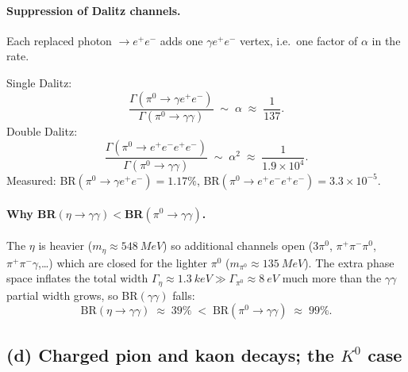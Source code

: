 \documentclass[11pt]{article}
\begin{document}
\paragraph{Suppression of Dalitz channels.} Each replaced photon $\to e^{+}e^{-}$ adds one $\gamma e^{+}e^{-}$ vertex, i.e.\ one factor of $\alpha$ in the rate.

Single Dalitz:
\begin{equation}
\frac{\Gamma(\pi^{0}\to\gamma e^{+}e^{-})}{\Gamma(\pi^{0}\to\gamma\gamma)}\;\sim\;\alpha\;\approx\;\frac{1}{137}.
\label{eq:Dalitz1}
\end{equation}
Double Dalitz:
\begin{equation}
\frac{\Gamma(\pi^{0}\to e^{+}e^{-}e^{+}e^{-})}{\Gamma(\pi^{0}\to\gamma\gamma)}\;\sim\;\alpha^{2}\;\approx\;\frac{1}{1.9\times 10^{4}}.
\label{eq:Dalitz2}
\end{equation}
Measured: BR$(\pi^{0}\to\gamma e^{+}e^{-})=1.17\%$, BR$(\pi^{0}\to e^{+}e^{-}e^{+}e^{-})=3.3\times 10^{-5}$.

\paragraph{Why BR$(\eta\to\gamma\gamma)<$BR$(\pi^{0}\to\gamma\gamma)$.} The $\eta$ is heavier ($m_{\eta}\approx\SI{548}{MeV}$) so additional channels open ($3\pi^{0}$, $\pi^{+}\pi^{-}\pi^{0}$, $\pi^{+}\pi^{-}\gamma$,\dots) which are closed for the lighter $\pi^{0}$ ($m_{\pi^{0}}\approx\SI{135}{MeV}$). The extra phase space inflates the total width $\Gamma_{\eta}\approx\SI{1.3}{keV}\gg\Gamma_{\pi^{0}}\approx\SI{8}{eV}$ much more than the $\gamma\gamma$ partial width grows, so BR$(\gamma\gamma)$ falls:
\begin{equation}
\text{BR}(\eta\to\gamma\gamma)\;\approx\;39\%\;<\;\text{BR}(\pi^{0}\to\gamma\gamma)\;\approx\;99\%.
\label{eq:eta-vs-pi0}
\end{equation}

\subsection*{(d) Charged pion and kaon decays; the $K^{0}$ case}
\end{document}
